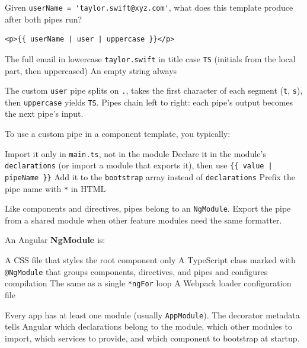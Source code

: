 \question[4]
Given \lstinline[style=tsinline]|userName = 'taylor.swift@xyz.com'|, what does this template produce after both pipes run?
\begin{lstlisting}[style=htmlinline]
<p>{{ userName | user | uppercase }}</p>
\end{lstlisting}
\begin{choices}
  \choice The full email in lowercase
  \choice \texttt{taylor.swift} in title case
  \CorrectChoice \texttt{TS} (initials from the local part, then uppercased)
  \choice An empty string always
\end{choices}
\begin{solution}
  The custom \lstinline[style=htmlinline]|user| pipe splits on \texttt{.}, takes the first character of each segment (\texttt{t}, \texttt{s}), then \lstinline[style=htmlinline]|uppercase| yields \texttt{TS}. Pipes chain left to right: each pipe's output becomes the next pipe's input.
\end{solution}

\question[4]
To use a custom pipe in a component template, you typically:
\begin{choices}
  \choice Import it only in \texttt{main.ts}, not in the module
  \CorrectChoice Declare it in the module's \texttt{declarations} (or import a module that exports it), then use \lstinline[style=htmlinline]!{{ value | pipeName }}!
  \choice Add it to the \texttt{bootstrap} array instead of \texttt{declarations}
  \choice Prefix the pipe name with \texttt{*} in HTML
\end{choices}
\begin{solution}
  Like components and directives, pipes belong to an \texttt{NgModule}. Export the pipe from a shared module when other feature modules need the same formatter.
\end{solution}

\question[4]
An Angular \textbf{NgModule} is:
\begin{choices}
  \choice A CSS file that styles the root component only
  \CorrectChoice A TypeScript class marked with \lstinline[style=tsinline]|@NgModule| that groups components, directives, and pipes and configures compilation
  \choice The same as a single \texttt{*ngFor} loop
  \choice A Webpack loader configuration file
\end{choices}
\begin{solution}
  Every app has at least one module (usually \texttt{AppModule}). The decorator metadata tells Angular which declarations belong to the module, which other modules to import, which services to provide, and which component to bootstrap at startup.
\end{solution}

